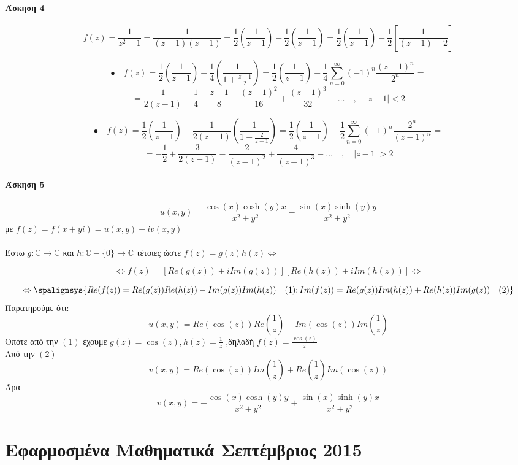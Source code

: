 \documentclass[12pt]{article}
\begin{document}
 \subsection{Άσκηση 4}

$$ f(z)=\frac{1}{z^2-1}=\frac{1}{(z+1)(z-1)}=\frac{1}{2}\left( \frac{1}{z-1}\right)-\frac{1}{2}\left(\frac{1}{z+1}\right)=\frac{1}{2}\left(\frac{1}{z-1}\right)-\frac{1}{2}\left[ \frac{1}{(z-1)+2}\right] $$

$$\bullet \quad 
f(z)=\frac{1}{2}\left(\frac{1}{z-1}\right) -\frac{1}{4}\left( \frac{1}{1+\frac{z-1}{2}} \right) =
\frac{1}{2}\left( \frac{1}{z-1}\right)-\frac{1}{4}
\sum_{n=0}^{\infty}(-1)^n\frac{(z-1)^n}{2^n}=
$$
$$=
\frac{1}{2(z-1)}-\frac{1}{4}+\frac{z-1}{8}-
\frac{(z-1)^2}{16}+\frac{(z-1)^3}{32}-\ldots \quad ,\quad |z-1|<2
$$

$$\bullet \quad
f(z)=\frac{1}{2}\left(\frac{1}{z-1}\right)-\frac{1}{2(z-1)}\left( \frac{1}{1+\frac{2}{z-1}}\right) =
\frac{1}{2}\left(\frac{1}{z-1}\right) -\frac{1}{2}
\sum_{n=0}^{\infty}(-1)^n\frac{2^n}{(z-1)^n}=
$$$$
=-\frac{1}{2}+\frac{3}{2(z-1)}-\frac{2}{(z-1)^2}+\frac{4}{(z-1)^3}-\ldots \quad,\quad |z-1|>2
$$

\newpage
 \subsection{Άσκηση 5}

$$ u(x,y)=\frac{\cos(x)\cosh(y)x}{x^2+y^2}-\frac{\sin(x)\sinh(y)y}{x^2+y^2} $$
με $ f(z)=f(x+yi)=u(x,y)+iv(x,y) $
\\ \\
Έστω $g:\mathbb{C}\to\mathbb{C}$ και $ h:\mathbb{C}-\{0\}\to\mathbb{C}$ τέτοιες ώστε $f(z)=g(z)h(z)\Leftrightarrow $

$$ \Leftrightarrow f(z)=[Re(g(z))+iIm(g(z))][Re(h(z))+iIm(h(z))] \Leftrightarrow $$

$$\Leftrightarrow \spalignsys{Re(f(z))=Re(g(z))Re(h(z))-Im(g(z))Im(h(z)) \quad(1) ;Im(f(z))=Re(g(z))Im(h(z))+Re(h(z))Im(g(z)) \quad (2)}  $$
 Παρατηρούμε ότι:
$$ u(x,y)=Re(\cos(z))Re\left(\frac{1}{z}\right)-Im(\cos(z))Im\left(\frac{1}{z}\right) $$
Οπότε από την $(1)$ έχουμε $ g(z)=\cos(z) , h(z)=\frac{1}{z}$ ,δηλαδή $f(z)=\frac{\cos(z)}{z}$
\\
Από την $(2)$
$$ v(x,y)= Re(\cos(z))Im\left(\frac{1}{z}\right)+Re\left(\frac{1}{z}\right)Im(\cos(z)) $$ 
Άρα
$$ v(x,y)= -\frac{\cos(x)\cosh(y)y}{x^2+y^2}+\frac{\sin(x)\sinh(y)x}{x^2+y^2} $$

\newpage 


\newpage \part{Εφαρμοσμένα Μαθηματικά Σεπτέμβριος 2015}
\end{document}
